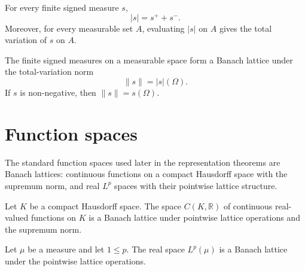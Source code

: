 \begin{lemma}
\label{lem:signedMeasure-abs-totalVariation}
\leanok
{}
For every finite signed measure $s$,
\[
  \lvert s\rvert = s^{+}+s^{-}.
\]
Moreover, for every measurable set $A$, evaluating $\lvert s\rvert$
on $A$ gives the total variation of $s$ on $A$.
\end{lemma}

\begin{theorem}
\label{thm:signedMeasure-banachLattice}
\leanok
{}
The finite signed measures on a measurable space form a Banach
lattice under the total-variation norm
\[
  \lVert s\rVert = |s|(\Omega).
\]
If $s$ is non-negative, then $\lVert s\rVert = s(\Omega)$.
\end{theorem}

\section{Function spaces}

The standard function spaces used later in the representation
theorems are Banach lattices: continuous functions on a compact
Hausdorff space with the supremum norm, and real $L^p$ spaces with
their pointwise lattice structure.

\begin{theorem}
\label{thm:cofk-banachLattice}
\leanok
{}
Let $K$ be a compact Hausdorff space. The space
$C(K,\mathbb{R})$ of continuous real-valued functions on $K$ is a
Banach lattice under pointwise lattice operations and the supremum
norm.
\end{theorem}

\begin{theorem}
\label{thm:lp-banachLattice}
\leanok
{}
Let $\mu$ be a measure and let $1 \le p$. The real space
$L^p(\mu)$ is a Banach lattice under the pointwise lattice
operations.
\end{theorem}

